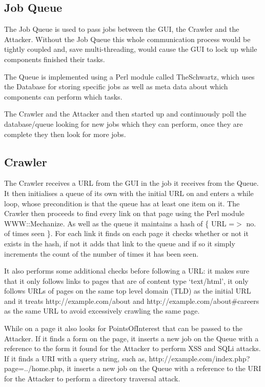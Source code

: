 \documentclass[12pt,a4paper]{article}
\begin{document}
\subsection{Job Queue}
The Job Queue is used to pass jobs between the GUI, the Crawler and the Attacker.  Without the Job Queue this whole communication process would be tightly coupled and, save multi-threading, would cause the GUI to lock up while components finished their tasks.

The Queue is implemented using a Perl module called TheSchwartz, which uses the Database for storing specific jobs as well as meta data about which components can perform which tasks.

The Crawler and the Attacker and then started up and continuously poll the database/queue looking for new jobs which they can perform, once they are complete they then look for more jobs.

\subsection{Crawler}
The Crawler receives a URL from the GUI in the job it receives from the Queue.  It then initialises a queue of its own with the initial URL on and enters a while loop, whose precondition is that the queue has at least one item on it.  The Crawler then proceeds to find every link on that page using the Perl module WWW::Mechanize.  As well as the queue it maintains a hash of \{ URL =$>$ no. of times seen \}.  For each link it finds on each page it checks whether or not it exists in the hash, if not it adds that link to the queue and if so it simply increments the count of the number of times it has been seen.

It also performs some additional checks before following a URL: it makes sure that it only follows links to pages that are of content type `text/html',  it only follows URLs of pages on the same top level domain (TLD) as the initial URL and it treats http://example.com/about and http://example.com/about\#careers as the same URL to avoid excessively crawling the same page.

While on a page it also looks for PointsOfInterest that can be passed to the Attacker.  If it finds a form on the page, it inserts a new job on the Queue with a reference to the form it found for the Attacker to perform XSS and SQLi attacks.  If it finds a URI with a query string, such as, http://example.com/index.php?page=../home.php, it inserts a new job on the Queue with a reference to the URI for the Attacker to perform a directory traversal attack.
\end{document}

